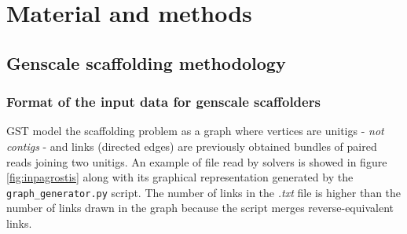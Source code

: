 \documentclass[12pt]{article}
\begin{document}

\newpage
\section{Material and methods} \label{sec:MatMet}
\subsection{Genscale scaffolding methodology}\label{sec:genscafmeth}
\subsubsection{Format of the input data for genscale scaffolders}
GST model the scaffolding problem as a graph where vertices are unitigs - \textit{not contigs} - and links (directed edges) are previously obtained bundles of paired reads joining two unitigs. An example of file read by solvers is showed in figure \ref{fig:inpagrostis} along with its graphical representation generated by the \texttt{graph\_generator.py} script. The number of links in the \textit{.txt} file is higher than the number of links drawn in the graph because the script merges reverse-equivalent links.
\end{document}
